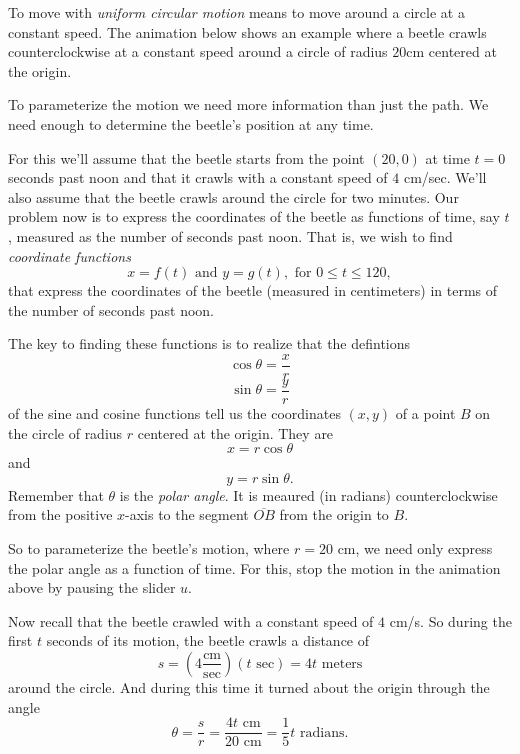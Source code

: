 \documentclass{ximera}
\begin{document}
\begin{exploration}

To move with \emph{uniform circular motion} means to move around a circle at a constant speed. The animation below shows an example where a beetle crawls counterclockwise at a constant speed around a circle of radius $20$cm centered at the origin.

 
\begin{onlineOnly}
    \begin{center}
\end{center}
\end{onlineOnly}
\end{exploration}

To parameterize the motion we need more information than just the path. We need enough to determine the beetle's position at any time.

For this we'll assume that the beetle starts from the point $(20,0)$ at time $t=0$ seconds past noon and that it crawls with a constant speed of $4$ cm/sec. We'll also assume that the beetle crawls around the circle for two minutes. Our problem now is to express the coordinates of the beetle as functions of time, say $t$, measured as the number of seconds past noon. That is, we wish to find \emph{coordinate functions}
\[
   x = f(t) \text{ and } y=g(t) , \text{ for } 0\leq t \leq 120 ,
\]
that express the coordinates of the beetle (measured in centimeters) in terms of the number of seconds past noon.

The key to finding these functions is to realize that the defintions
\[
    \cos \theta = \frac{x}{r}
\]
\[
    \sin\theta = \frac{y}{r}
\]
of the sine and cosine functions tell us the coordinates $(x,y)$ of a point $B$ on the circle of radius $r$ centered at the origin. They are 
\[
    x = r\cos\theta
\]
and 
\[
   y= r\sin \theta .
\]
Remember that $\theta$ is the \emph{polar angle}. It is meaured (in radians) counterclockwise from the positive $x$-axis to the segment $\overline{OB}$ from the origin to $B$.

So to parameterize the beetle's motion, where $r=20$ cm, we need only express the polar angle as a function of time. For this, stop the motion in the animation above by pausing the slider $u$. 

Now recall that the beetle crawled with a constant speed of $4$ cm/s.  So during the first $t$ seconds of its motion, the beetle crawls a distance of
\[
    s = \left( 4 \frac{\text{cm}}{\text{sec}} \right) (t \text{ sec}) = 4t \text{ meters}  
\]
around the circle. And during this time it turned about the origin through the angle
\[
    \theta = \frac{s}{r} = \frac{4t \text{ cm}}{20 \text{ cm}} = \frac{1}{5}t \text{ radians}.
\]
\end{document}
